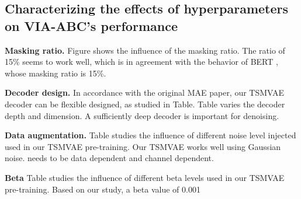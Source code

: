 \documentclass[12pt]{article} %
\begin{document}
\newpage

\subsection*{Characterizing the effects of hyperparameters on VIA-ABC's performance}

\textbf{Masking ratio.} Figure shows the influence of the masking ratio. The ratio of 15\% seems to work well, which is in agreement with the behavior of BERT \citep{devlin2019bert}, whose masking ratio is 15\%. 

\textbf{Decoder design.} In accordance with the original MAE paper, our TSMVAE decoder can be flexible designed, as studied in Table. Table varies the decoder depth and dimension. A sufficiently deep decoder is important for denoising.

\textbf{Data augmentation.} Table studies the influence of different noise level injected used in our TSMVAE pre-training. Our TSMVAE works well using Gaussian noise.  needs to be data dependent and channel dependent.

\textbf{Beta} Table studies the influence of different beta levels used in our TSMVAE pre-training. Based on our study, a beta value of 0.001 
\end{document}
